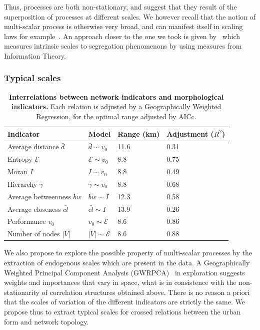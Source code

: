 Thus, processes are both non-stationary, and  suggest that they result of the superposition of processes at different scales. We however recall that the notion of multi-scalar process is otherwise very broad, and can manifest itself in scaling laws for example~\citep{west2017scale}. An approach closer to the one we took is given by~\cite{Chodrow31102017} which measures intrinsic scales to segregation phenomenons by using measures from Information Theory.





\subsubsection{Typical scales}

\begin{table}[h!]
\caption{\textbf{Interrelations between network indicators and morphological indicators.} Each relation is adjusted by a Geographically Weighted Regression, for the optimal range adjusted by AICc.\label{tab:staticcorrelations:gwr}}
\begin{center}
\begin{tabular}{|l|l|l|l|}
\hline
Indicator & Model & Range (km) & Adjustment ($R^2$) \\ \hline
Average distance $\bar{d}$ & $\bar{d} \sim v_0$ & 11.6 & 0.31 \\
Entropy $\mathcal{E}$  & $\mathcal{E} \sim v_0$ &  8.8  &0.75 \\
Moran $I$ & $I \sim v_0$ & 8.8 & 0.49 \\
Hierarchy $\gamma$ & $\gamma \sim v_0$ & 8.8  & 0.68 \\\hline
Average betweenness $\bar{bw}$ & $\bar{bw} \sim I$ & 12.3 & 0.58 \\
Average closeness $\bar{cl}$ & $\bar{cl}\sim I$ & 13.9 & 0.26 \\
Performance $v_0$ & $v_0 \sim \mathcal{E}$ & 8.6  & 0.86 \\
Number of nodes $\left|V\right|$ & $\left|V\right| \sim \mathcal{E}$ & 8.6  & 0.88 \\\hline
\end{tabular}
\end{center}
\end{table}


We also propose to explore the possible property of multi-scalar processes by the extraction of endogenous scales which are present in the data. A Geographically Weighted Principal Component Analysis (GWRPCA)~\cite{harris2011geographically} in exploration suggests weights and importances that vary in space, what is in consistence with the non-stationarity of correlation structures obtained above. There is no reason a priori that the scales of variation of the different indicators are strictly the same. We propose thus to extract typical scales for crossed relations between the urban form and network topology.

